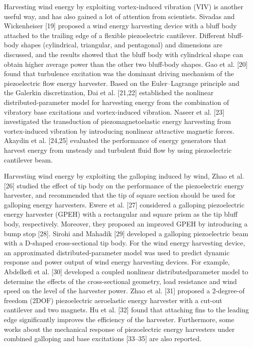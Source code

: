 \documentclass{article}
\begin{document}
Harvesting wind energy by exploiting vortex-induced vibration (VIV) is another useful way, and has also
gained a lot of attention from scientists. Sivadas and Wickenheiser [19] proposed a wind energy harvesting
device with a bluff body attached to the trailing edge of a flexible piezoelectric cantilever. Different bluff-body
shapes (cylindrical, triangular, and pentagonal) and dimensions are discussed, and the results showed that the
bluff body with cylindrical shape can obtain higher average power than the other two bluff-body shapes. Gao et
al. [20] found that turbulence excitation was the dominant driving mechanism of the piezoelectric flow energy
harvester. Based on the Euler–Lagrange principle and the Galerkin discretization, Dai et al. [21,22] established
the nonlinear distributed-parameter model for harvesting energy from the combination of vibratory base excitations and vortex-induced vibration. Naseer et al. [23] investigated the transduction of piezomagnetoelastic
energy harvesting from vortex-induced vibration by introducing nonlinear attractive magnetic forces. Akaydin
et al. [24,25] evaluated the performance of energy generators that harvest energy from unsteady and turbulent
fluid flow by using piezoelectric cantilever beam.

Harvesting wind energy by exploiting the galloping induced by wind, 
Zhao et al. [26] studied the effect
of tip body on the performance of the piezoelectric energy harvester, 
and recommended that the tip of square
section should be used for galloping energy harvesters. Ewere et al. 
[27] considered a galloping piezoelectric
energy harvester (GPEH) with a rectangular and square prism as the 
tip bluff body, respectively. Moreover,
they proposed an improved GPEH by introducing a bump stop [28]. 
Sirohi and Mahadik [29] developed a
galloping piezoelectric beam with a D-shaped cross-sectional tip 
body. For the wind energy harvesting device,
an approximated distributed-parameter model was used to predict 
dynamic response and power output of
wind energy harvesting devices. For example, Abdelkefi et al. [30] 
developed a coupled nonlinear distributedparameter model to 
determine the effects of the cross-sectional geometry, load 
resistance and wind speed
on the level of the harvester power. Zhao et al. [31] proposed 
a 2-degree-of freedom (2DOF) piezoelectric
aeroelastic energy harvester with a cut-out cantilever and two 
magnets. Hu et al. [32] found that attaching
fins to the leading edge significantly improves the efficiency 
of the harvester. Furthermore, some works about
the mechanical response of piezoelectric energy harvesters under 
combined galloping and base excitations
[33–35] are also reported.
\end{document}
